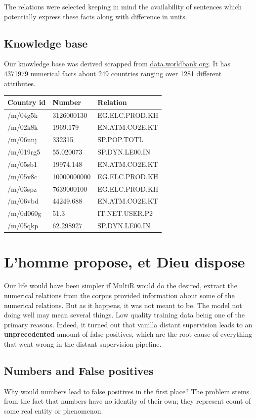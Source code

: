\documentclass[a4paper,10pt]{article}
\begin{document}
The relations were selected keeping in mind the availability of sentences which potentially express these facts
along with difference in units.

\subsection{Knowledge base}

Our knowledge base was derived scrapped from \url{data.worldbank.org}.
It has 4371979 numerical facts about 249 countries ranging over 1281 different attributes. 
\begin{center}
\begin{tabular}{|l|l|l|}
\hline
Country id & Number & Relation \\
\hline
/m/04g5k&3126000130&EG.ELC.PROD.KH\\
/m/02k8k&1969.179&EN.ATM.CO2E.KT\\
/m/06nnj&332315&SP.POP.TOTL\\
/m/019rg5&55.020073&SP.DYN.LE00.IN\\
/m/05sb1&19974.148&EN.ATM.CO2E.KT\\
/m/05v8c&10000000000&EG.ELC.PROD.KH\\
/m/03spz&7639000100&EG.ELC.PROD.KH\\
/m/06vbd&44249.688&EN.ATM.CO2E.KT\\
/m/0d060g&51.3&IT.NET.USER.P2\\
/m/05qkp&62.298927&SP.DYN.LE00.IN\\
\hline
\end{tabular}
\end{center}

\section{L'homme propose, et Dieu dispose}
Our life would have been simpler if MultiR would do the desired, extract the numerical relations from the corpus provided
information about some of the numerical relations. But as it happens, it was not meant to be.
The model not doing well may mean several things. Low quality training data being one of the primary reasons.
Indeed, it turned out that vanilla distant supervision leads to an \textbf{unprecedented} amount of false positives, which are the root cause
of everything that went wrong in the distant supervision pipeline.

\subsection{Numbers and False positives}
Why would numbers lead to false positives in the first place?
The problem stems from the fact that numbers have no identity of their own; they represent count of
some real entity or phenomenon.
\end{document}
